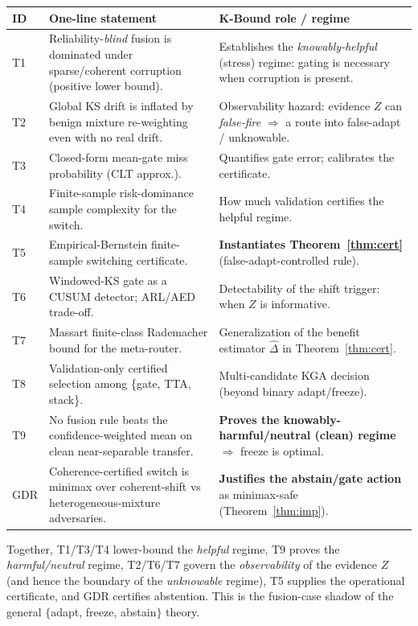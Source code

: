 \documentclass[11pt]{article}
\theoremstyle{plain}
\theoremstyle{definition}
\begin{document}
\begin{center}\small
\begin{tabular}{p{}p{}p{}}
\toprule
ID & One-line statement & K-Bound role / regime \\
\midrule
T1 & Reliability-\emph{blind} fusion is dominated under sparse/coherent corruption (positive lower bound). & Establishes the \emph{knowably-helpful} (stress) regime: gating is necessary when corruption is present. \\
T2 & Global KS drift is inflated by benign mixture re-weighting even with no real drift. & Observability hazard: evidence $Z$ can \emph{false-fire} $\Rightarrow$ a route into false-adapt / unknowable. \\
T3 & Closed-form mean-gate miss probability (CLT approx.). & Quantifies gate error; calibrates the certificate. \\
T4 & Finite-sample risk-dominance sample complexity for the switch. & How much validation certifies the helpful regime. \\
T5 & Empirical-Bernstein finite-sample switching certificate. & \textbf{Instantiates Theorem~\ref{thm:cert}} (false-adapt-controlled rule). \\
T6 & Windowed-KS gate as a CUSUM detector; ARL/AED trade-off. & Detectability of the shift trigger: when $Z$ is informative. \\
T7 & Massart finite-class Rademacher bound for the meta-router. & Generalization of the benefit estimator $\widehat\Delta$ in Theorem~\ref{thm:cert}. \\
T8 & Validation-only certified selection among \{gate, TTA, stack\}. & Multi-candidate KGA decision (beyond binary adapt/freeze). \\
T9 & No fusion rule beats the confidence-weighted mean on clean near-separable transfer. & \textbf{Proves the knowably-harmful/neutral (clean) regime} $\Rightarrow$ freeze is optimal. \\
GDR & Coherence-certified switch is minimax over coherent-shift vs heterogeneous-mixture adversaries. & \textbf{Justifies the abstain/gate action} as minimax-safe (Theorem~\ref{thm:imp}). \\
\bottomrule
\end{tabular}
\end{center}

\noindent Together, T1/T3/T4 lower-bound the \emph{helpful} regime, T9 proves the
\emph{harmful/neutral} regime, T2/T6/T7 govern the \emph{observability} of the evidence
$Z$ (and hence the boundary of the \emph{unknowable} regime), T5 supplies the operational
certificate, and GDR certifies abstention. This is the fusion-case shadow of the general
$\{$adapt, freeze, abstain$\}$ theory.
\end{document}
